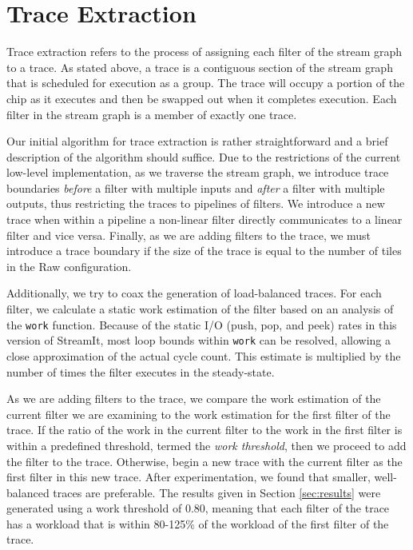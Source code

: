 \section{Trace Extraction}
\label{sec:extraction}	
Trace extraction refers to the process of assigning each filter of the
stream graph to a trace.  As stated above, a trace is a contiguous
section of the stream graph that is scheduled for execution as a
group. The trace will occupy a portion of the chip as it executes and
then be swapped out when it completes execution.  Each filter in the
stream graph is a member of exactly one trace.

Our initial algorithm for trace extraction is rather straightforward
and a brief description of the algorithm should suffice.  Due to the
restrictions of the current low-level implementation, as we traverse
the stream graph, we introduce trace boundaries {\it before} a filter
with multiple inputs and {\it after} a filter with multiple outputs,
thus restricting the traces to pipelines of filters. We introduce a
new trace when within a pipeline a non-linear filter directly
communicates to a linear filter and vice versa. Finally, as we are
adding filters to the trace, we must introduce a trace boundary if the
size of the trace is equal to the number of tiles in the Raw
configuration.


Additionally, we try to coax the generation of load-balanced traces.
For each filter, we calculate a static work estimation of the filter
based on an analysis of the {\tt work} function.  Because of the
static I/O (push, pop, and peek) rates in this version of StreamIt,
most loop bounds within {\tt work} can be resolved, allowing a close
approximation of the actual cycle count.  This estimate is multiplied
by the number of times the filter executes in the steady-state.

As we are adding filters to the trace, we compare the work estimation
of the current filter we are examining to the work estimation for the
first filter of the trace.  If the ratio of the work in the current
filter to the work in the first filter is within a predefined
threshold, termed the {\it work threshold}, then we proceed to add the
filter to the trace.  Otherwise, begin a new trace with the current
filter as the first filter in this new trace.  After experimentation,
we found that smaller, well-balanced traces are preferable.  The
results given in Section \ref{sec:results} were generated using a work
threshold of 0.80, meaning that each filter of the trace has a
workload that is within 80-125\% of the workload of the first filter
of the trace.

